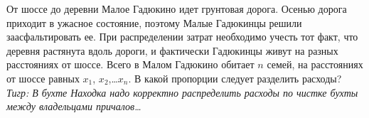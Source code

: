 \begin{problem}[Дорога]
От шоссе до деревни Малое Гадюкино идет грунтовая дорога. Осенью дорога приходит в ужасное состояние, поэтому Малые Гадюкинцы решили заасфальтировать ее. При распределении затрат необходимо учесть тот факт, что деревня растянута вдоль дороги, и фактически Гадюкинцы живут на разных расстояниях от шоссе. Всего в Малом Гадюкино обитает  $n$  семей, на расстояниях от шоссе равных  $x_{1} $,  $x_{2} $,\ldots  $x_{n} $.
В какой пропорции следует разделить расходы?\\
{\it Тигр:  В бухте Находка надо корректно распределить расходы по чистке бухты между владельцами причалов\ldots }




\begin{sol}

\end{sol}
\end{problem}



